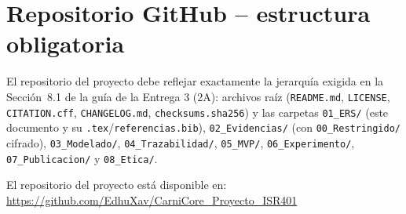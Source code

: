 \documentclass[11pt,a4paper]{article}
\begin{document}
\section{Repositorio GitHub -- estructura obligatoria}
El repositorio del proyecto debe reflejar exactamente la jerarquía exigida en la Sección~8.1 de la guía de la Entrega 3 (2A): archivos raíz (\texttt{README.md}, \texttt{LICENSE}, \texttt{CITATION.cff}, \texttt{CHANGELOG.md}, \texttt{checksums.sha256}) y las carpetas \texttt{01\_ERS/} (este documento y su \texttt{.tex}/\texttt{referencias.bib}), \texttt{02\_Evidencias/} (con \texttt{00\_Restringido/} cifrado), \texttt{03\_Modelado/}, \texttt{04\_Trazabilidad/}, \texttt{05\_MVP/}, \texttt{06\_Experimento/}, \texttt{07\_Publicacion/} y \texttt{08\_Etica/}.

El repositorio del proyecto está disponible en: \url{https://github.com/EdhuXav/CarniCore_Proyecto_ISR401}


\newpage


\end{document}
